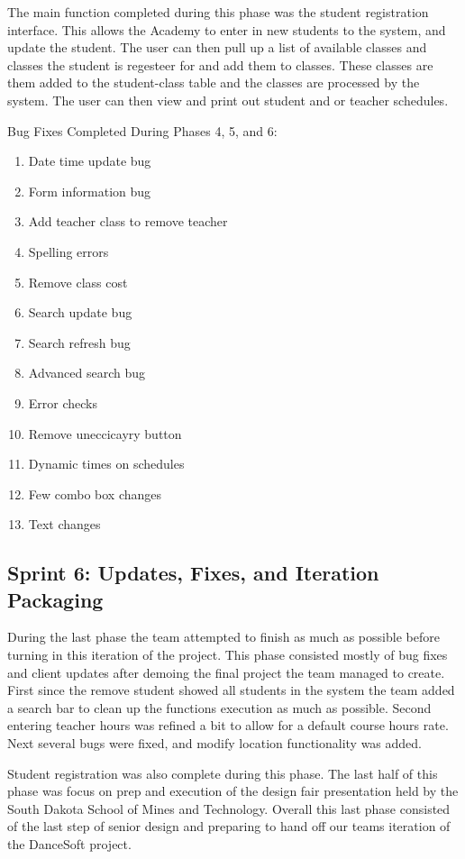 The main function completed during this phase was the student registration interface. This allows the Academy to enter in new students to the system, and update the student. The user can then pull up a list of available classes and classes the student is regesteer for and add them to classes. These classes are them added to the student-class table and the classes are processed by the system. The user can then view and print out student and or teacher schedules.

Bug Fixes Completed During Phases 4, 5, and 6:
\begin{enumerate}
\item Date time update bug
\item Form information bug
\item Add teacher class to remove teacher
\item Spelling errors
\item Remove class cost
\item Search update bug
\item Search refresh bug
\item Advanced search bug
\item Error checks
\item Remove uneccicayry button
\item Dynamic times on schedules
\item Few combo box changes
\item Text changes
\end{enumerate}

\subsection{Sprint 6: Updates, Fixes, and Iteration Packaging}
During the last phase the team attempted to finish as much as possible before turning in this iteration of the project.  This phase consisted mostly of bug fixes and client updates after demoing the final project the team managed to create.  First since the remove student showed all students in the system the team added a search bar to clean up the functions execution as much as possible. Second entering teacher hours was refined a bit to allow for a default course hours rate. Next several bugs were fixed, and modify location functionality was added.

Student registration was also complete during this phase. The last half of this phase was focus on prep and execution of the design fair presentation held by the South Dakota School of Mines and Technology. Overall this last phase consisted of the last step of senior design and preparing to hand off our teams iteration of the DanceSoft project.


